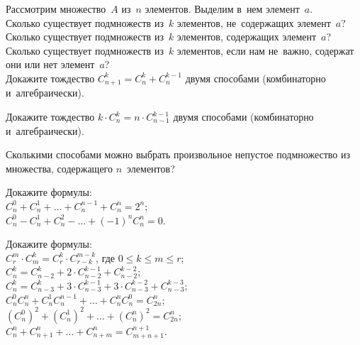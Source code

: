 \begin{problems}
\item
Рассмотрим множество~$A$ из~$n$ элементов.
Выделим в~нем элемент~$a$.
\\
\subproblem
Сколько существует подмножеств из~$k$ элементов, не~содержащих элемент~$a$?
\\
\subproblem
Сколько существует подмножеств из~$k$ элементов, содержащих элемент~$a$?
\\
\subproblem
Сколько существует подмножеств из~$k$ элементов, если нам не~важно, содержат
они или нет элемент~$a$?
\\
\subproblem
Докажите тождество $C_{n+1}^{k} = C_{n}^{k} + C_{n}^{k-1}$ двумя способами
(комбинаторно и~алгебраически).

\item
Докажите тождество $k \cdot C_{n}^{k} = n \cdot C_{n-1}^{k-1}$ двумя способами
(комбинаторно и~алгебраически).

\item
\subproblem
Сколькими способами можно выбрать произвольное непустое подмножество
из множества, содержащего $n$~элементов?
\par
Докажите формулы:
\\[0.3ex]
\subproblem
\(
    C_{n}^{0} + C_{n}^{1} + \ldots + C_{n}^{n-1} + C_{n}^{n}
=
    2^{n}
\);
\\[0.5ex]
\subproblem
\(
    C_{n}^{0} - C_{n}^{1} + C_{n}^{2} - \ldots + (-1)^{n} C_{n}^{n}
=
    0
\).

\item
Докажите формулы:
\\[0.3ex]
\subproblem
\(
    C_{r}^{m} \cdot C_{m}^{k}
=
    C_{r}^{k} \cdot C_{r-k}^{m-k}
\), где $0 \leq k \leq m \leq r$;
\\[0.5ex]
\subproblem
\(
    C_{n}^{k}
=
    C_{n-2}^{k} + 2 \cdot C_{n-2}^{k-1} + C_{n-2}^{k-2}
\);
\\[0.5ex]
\subproblem
\(
    C_{n}^{k}
=
    C_{n-3}^{k} + 3 \cdot C_{n-3}^{k-1} + 3 \cdot C_{n-3}^{k-2} + C_{n-3}^{k-3}
\);
\\[0.5ex]
\subproblem
\(
    C_{n}^{0} C_{n}^{n} + C_{n}^{1} C_{n}^{n-1} + \ldots + C_{n}^{n} C_{n}^{0}
=
    C_{2n}^{n}
\);
\\[0.5ex]
\subproblem
\(
    (C_{n}^{0})^{2} + (C_{n}^{1})^{2} + \ldots + (C_{n}^{n})^{2}
=
    C_{2n}^{n}
\);
\\[0.5ex]
\subproblem
\(
    C_{n}^{n} + C_{n+1}^{n} + \ldots + C_{n+m}^{n}
=
    C_{m+n+1}^{n+1}
\).

\end{problems}

